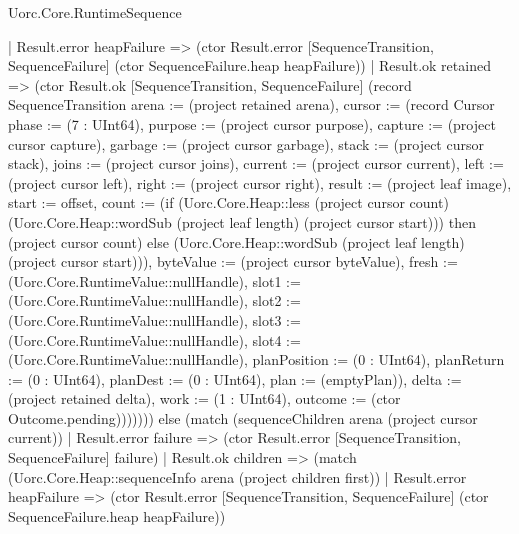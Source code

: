 \begin{lexlean}{Uorc.Core.RuntimeSequence}
\begin{semanticmodule}
{          | Result.error heapFailure => (ctor Result.error [SequenceTransition, SequenceFailure] (ctor SequenceFailure.heap heapFailure))
          | Result.ok retained => (ctor Result.ok [SequenceTransition, SequenceFailure] (record SequenceTransition {arena := (project retained arena), cursor := (record Cursor {phase := (7 : UInt64), purpose := (project cursor purpose), capture := (project cursor capture), garbage := (project cursor garbage), stack := (project cursor stack), joins := (project cursor joins), current := (project cursor current), left := (project cursor left), right := (project cursor right), result := (project leaf image), start := offset, count := (if (Uorc.Core.Heap::less (project cursor count) (Uorc.Core.Heap::wordSub (project leaf length) (project cursor start))) then (project cursor count) else (Uorc.Core.Heap::wordSub (project leaf length) (project cursor start))), byteValue := (project cursor byteValue), fresh := (Uorc.Core.RuntimeValue::nullHandle), slot1 := (Uorc.Core.RuntimeValue::nullHandle), slot2 := (Uorc.Core.RuntimeValue::nullHandle), slot3 := (Uorc.Core.RuntimeValue::nullHandle), slot4 := (Uorc.Core.RuntimeValue::nullHandle), planPosition := (0 : UInt64), planReturn := (0 : UInt64), planDest := (0 : UInt64), plan := (emptyPlan)}), delta := (project retained delta), work := (1 : UInt64), outcome := (ctor Outcome.pending)})))))) else (match (sequenceChildren arena (project cursor current))
      | Result.error failure => (ctor Result.error [SequenceTransition, SequenceFailure] failure)
      | Result.ok children => (match (Uorc.Core.Heap::sequenceInfo arena (project children first))
        | Result.error heapFailure => (ctor Result.error [SequenceTransition, SequenceFailure] (ctor SequenceFailure.heap heapFailure))
}
\end{semanticmodule}
\end{lexlean}
